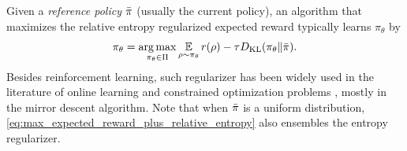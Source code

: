 Given a \emph{reference policy} $\bar{\pi}$ (usually the current policy), 
an algorithm that maximizes the relative entropy regularized expected reward typically learns $\pi_{\theta} $ by 
\begin{equation}
\label{eq:max_expected_reward_plus_relative_entropy}
\pi_{\theta} = \operatorname*{arg\,max}\limits_{\pi_\theta \in \Pi} { \operatorname*{\mathbb{E}}\limits_{\rho \sim \pi_\theta}{  r(\rho)  - \tau D_{\mathrm{KL}}(\pi_\theta \| \bar{\pi}) } }.
\end{equation}
Besides reinforcement learning, such regularizer has been widely used in the literature of online learning and constrained optimization problems \citep{nemirovskii1983problem,beck2003mirror}, mostly in the mirror descent algorithm.
Note that when $\bar{\pi}$ is a uniform distribution, \cref{eq:max_expected_reward_plus_relative_entropy} also ensembles the entropy regularizer.

